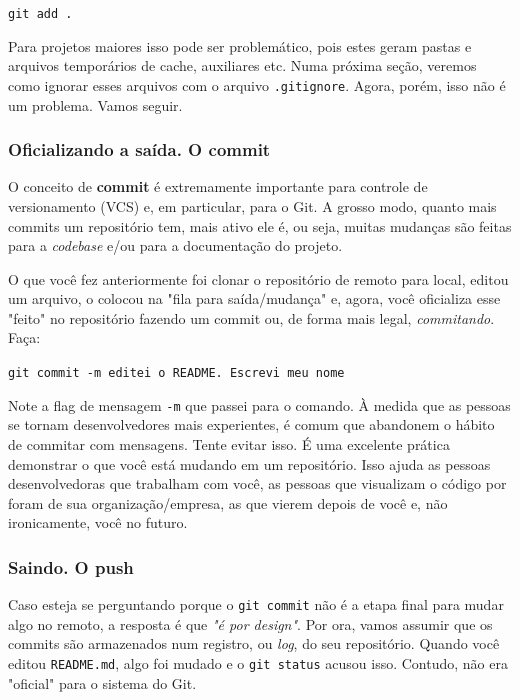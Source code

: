 \documentclass{article}
\begin{document}
  \vspace{1ex}
  \texttt{git add .}
  \vspace{1ex}

  Para projetos maiores isso pode ser problemático, pois estes geram pastas e arquivos temporários de cache, auxiliares etc. Numa próxima
  seção, veremos como ignorar esses arquivos com o arquivo \texttt{.gitignore}. Agora, porém, isso não é um problema. 
  Vamos seguir. 

  \subsubsection{Oficializando a saída. O commit}

  O conceito de \textbf{commit} é extremamente importante para controle de versionamento (VCS) e, em particular, para o Git. 
  A grosso modo, quanto mais commits um repositório tem, mais ativo ele é, ou seja, muitas mudanças são feitas para a \textit{codebase}
  e/ou para a documentação do projeto.

  O que você fez anteriormente foi clonar o repositório de remoto para local, editou um arquivo, 
  o colocou na "fila para saída/mudança" e, agora, você oficializa esse "feito" no repositório fazendo um commit ou,
  de forma mais legal, \textit{commitando}. Faça: 

  \vspace{1ex}
  \texttt{git commit -m \textquotesingle\!\textquotesingle editei o README. Escrevi meu nome\textquotesingle\!\textquotesingle}
  \vspace{1ex}

  Note a flag de mensagem \texttt{-m} que passei para o comando. À medida que as pessoas se tornam desenvolvedores mais experientes, 
  é comum que abandonem o hábito de commitar com mensagens. Tente evitar isso. É uma excelente prática demonstrar o que você está 
  mudando em um repositório. Isso ajuda as pessoas desenvolvedoras que trabalham com você, as pessoas que visualizam o código por foram
  de sua organização/empresa, as que vierem depois de você e, não ironicamente, você no futuro. 

  \subsubsection{Saindo. O push}
  \label{sec:push}

  Caso esteja se perguntando porque o \texttt{git commit} não é a etapa final para mudar algo no remoto, a resposta é que 
  \textit{"é por design"}. Por ora, vamos assumir que os commits são armazenados num registro, ou \textit{log}, do seu repositório. 
  Quando você editou \texttt{README.md}, algo foi mudado e o \texttt{git status} acusou isso. Contudo, não era "oficial" para o 
  sistema do Git. 
  
\end{document}
